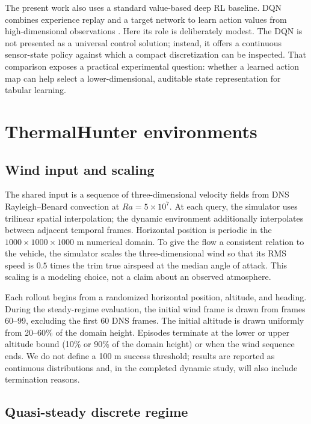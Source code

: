 \documentclass{article}
\begin{document}
The present work also uses a standard value-based deep RL baseline.  DQN
combines experience replay and a target network to learn action values from
high-dimensional observations \citep{mnih2015}.  Here its role is deliberately
modest.  The DQN is not presented as a universal control solution; instead, it
offers a continuous sensor-state policy against which a compact discretization
can be inspected.  That comparison exposes a practical experimental question:
whether a learned action map can help select a lower-dimensional, auditable
state representation for tabular learning.

\section{ThermalHunter environments}
\label{sec:environment}

\subsection{Wind input and scaling}

The shared input is a sequence of three-dimensional velocity fields from DNS
Rayleigh--Benard convection at $Ra=5\times10^{7}$.  At each query, the simulator
uses trilinear spatial interpolation; the dynamic environment additionally
interpolates between adjacent temporal frames.  Horizontal position is periodic
in the $1000\times1000\times1000$ m numerical domain.  To give the flow a
consistent relation to the vehicle, the simulator scales the three-dimensional
wind so that its RMS speed is $0.5$ times the trim true airspeed at the median
angle of attack.  This scaling is a modeling choice, not a claim about an
observed atmosphere.

Each rollout begins from a randomized horizontal position, altitude, and
heading.  During the steady-regime evaluation, the initial wind frame is drawn
from frames 60--99, excluding the first 60 DNS frames.  The initial altitude is
drawn uniformly from 20--60\% of the domain height.  Episodes terminate at the
lower or upper altitude bound (10\% or 90\% of the domain height) or when the
wind sequence ends.  We do not define a 100 m success threshold; results are
reported as continuous distributions and, in the completed dynamic study,
will also include termination reasons.

\subsection{Quasi-steady discrete regime}
\label{sec:steady_environment}
\end{document}
